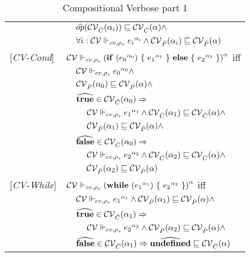 \begin{table}[htb]
\begin{tabular}{l l l l}
&&\multicolumn{2}{l}{$\widehat{op} (\Cat(\all_i)) \sqsubseteq \Cat(\all) \wedge$}\\
&&\multicolumn{2}{l}{$\forall i : \ccest {\lbt i} \wedge \Pat(\all_i) \sqsubseteq \Pat(\all)  $}\\
{[\textit{CV-Cond}]}&\multicolumn{3}{l}{$\ccestl{\cond {\lbt 0} {\lbt 1} {\lbt 2}} $ iff}\\
&&\multicolumn{2}{l}{$ \ccest {\lbt 0} \wedge $}\\
&&\multicolumn{2}{l}{$\Pat(\all_0) \sqsubseteq \Pat(\all) \wedge$} \\
&&\multicolumn{2}{l}{$\widehat{\true} \in \Cat(\all_0) \Rightarrow$}\\
&&&$\ccest {\lbt 1} \wedge \Cat(\all_1) \sqsubseteq \Cat(\all)\wedge$\\
&&&$\Pat(\all_1) \sqsubseteq \Pat(\all) \wedge$ \\
&&\multicolumn{2}{l}{$\widehat{\false} \in \Cat(\all_0) \Rightarrow$}\\
&&&$\ccest {\lbt 2} \wedge \Cat(\all_2) \sqsubseteq \Cat(\all) \wedge$\\
&&&$\Pat(\all_2) \sqsubseteq \Pat(\all)$ \\
{[\textit{CV-While}]}&\multicolumn{3}{l}{$\ccestl {\while {\lbt 1} {\lbt 2}} $ iff}\\
&&\multicolumn{2}{l}{$ \ccest {\lbt 1} \wedge \Pat(\all_1) \sqsubseteq \Pat(\all) \wedge$}\\
&&\multicolumn{2}{l}{$\widehat{\true} \in \Cat(\all_1) \Rightarrow$}\\
&&&$\ccest {\lbt 2} \wedge \Pat(\all_2) \sqsubseteq \Pat(\all)\wedge$\\
&&\multicolumn{2}{l}{$\widehat{\false} \in \Cat(\all_1) \Rightarrow \widehat{\undef} \sqsubseteq \Cat(\all)$}\\
\end{tabular}
\caption{Compositional Verbose part 1}
\label{tab:CompVerb1}
\end{table}

